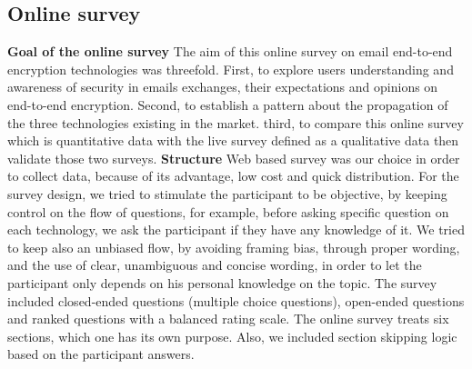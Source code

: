 \subsection{Online survey}
\textbf{Goal of the online survey}
The aim of this online survey on email end-to-end encryption technologies was threefold. First, to explore users understanding and awareness of security in emails exchanges, their expectations and opinions on end-to-end encryption. Second, to establish a pattern about the propagation of the three technologies existing in the market. third, to compare this online survey which is quantitative data with the live survey defined as a qualitative data then validate those two surveys.
\newline  
\textbf{Structure}
Web based survey was our choice in order to collect data, because of its advantage, low cost and quick distribution. For the survey design, we tried to stimulate the participant to be objective, by keeping control on the flow of questions, for example, before asking specific question on each technology, we ask the participant if they have any knowledge of it. 
We tried to keep also an unbiased flow, by avoiding framing bias, through proper wording, and the use of clear, unambiguous and concise wording, in order to let the participant only depends on his personal knowledge on the topic.
The survey included closed-ended questions (multiple choice questions), open-ended questions and ranked questions with a balanced rating scale.
The online survey treats six sections, which one has its own purpose. Also, we included section skipping logic based on the participant answers.

